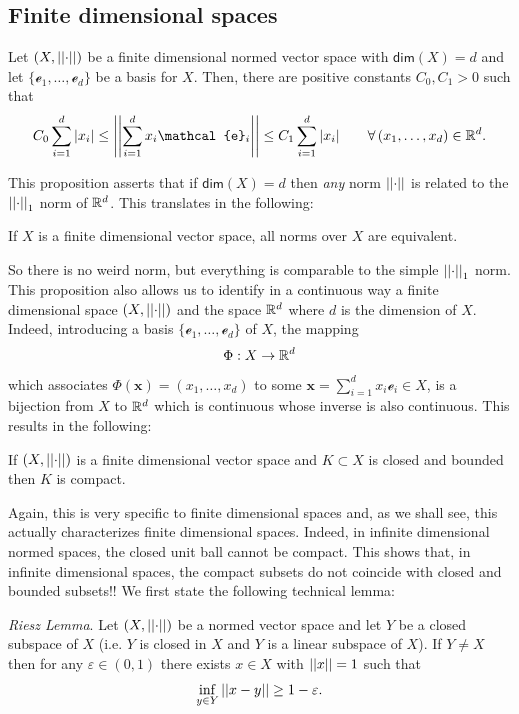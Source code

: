 \documentclass{article}
\begin{document}
\subsection{Finite dimensional spaces}
\begin{proposition}
	Let $(X,\left|\left|\cdot\right|\right|)$ be a finite dimensional normed vector space with $\mathsf{dim}(X)=d$ and let $\{\mathcal{e}_1,\ldots,\mathcal{e}_d\}$ be a basis for $X$. Then, there are positive constants $C_0,C_1>0$ such that
	\begin{equation*}
		C_0\sum_{i=1}^{d}|x_i|\leq\norm{\sum_{i=1}^{d}x_i\mathcal{e}_{i}}\leq C_1\sum_{i=1}^{d}|x_i|\qquad\every(x_1,\ldots,x_d)\in\R^{d}.
	\end{equation*}
\end{proposition}
This proposition asserts that if $\mathsf{dim}(X)=d$ then \textit{any} norm $\left|\left|\cdot\right|\right|$ is related to the $\left|\left|\cdot\right|\right|_1$ norm of $\mathbb{R}^{d}$. This translates in the following:
\begin{proposition}
	If $X$ is a finite dimensional vector space, all norms over $X$ are equivalent.
\end{proposition}
So there is no weird norm, but everything is comparable to the simple $\left|\left|\cdot\right|\right|_1$ norm. This proposition also allows us to identify in a continuous way a finite dimensional space $(X,\left|\left|\cdot\right|\right|)$ and the space $\mathbb{R}^{d}$ where $d$ is the dimension of $X$. Indeed, introducing a basis $\{\mathcal{e}_1,\ldots,\mathcal{e}_d\}$ of $X$, the mapping
\begin{equation*}
	\Phi:X\to\mathbb{R}^{d}
\end{equation*}
which associates $\Phi(\mathbf{x})=(x_1,\ldots,x_d)$ to some $\mathbf{x}=\sum_{i=1}^{d}x_i\mathcal{e}_i\in X$, is a bijection from $X$ to $\mathbb{R}^{d}$ which is continuous whose inverse is also continuous. This results in the following:
\begin{corollary}
	If $(X,\left|\left|\cdot\right|\right|)$ is a finite dimensional vector space and $K\subset X$ is closed and bounded then $K$ is compact.
\end{corollary}
Again, this is very speciﬁc to ﬁnite dimensional spaces and, as we shall see, this actually
characterizes ﬁnite dimensional spaces. Indeed, in inﬁnite dimensional normed spaces, the
closed unit ball cannot be compact. This shows that, in inﬁnite dimensional spaces, the
compact subsets do not coincide with closed and bounded subsets!!
We ﬁrst state the following technical lemma:
\begin{lemma}
	\emph{Riesz Lemma}. Let $(X,\left|\left|\cdot\right|\right|)$ be a normed vector space and let $Y$ be a closed subspace of $X$ (i.e. $Y$ is closed in $X$ and $Y$ is a linear subspace of $X$). If $Y\neq X$ then for any $\varepsilon\in(0,1)$ there exists $x\in X$ with $\left|\left|x\right|\right|=1$ such that
	\begin{equation*}
		\inf_{y\in Y}\left|\left|x-y\right|\right|\geq1-\varepsilon.
	\end{equation*}
\end{lemma}
\end{document}
